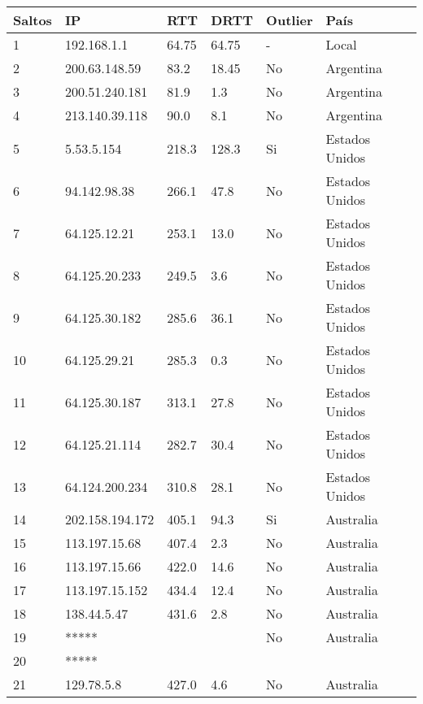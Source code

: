 \begin{center}
    \begin{tabular}{| l | l | l | l | l | l | }
    \hline
    Saltos & IP             & RTT    & DRTT   & Outlier & País       \\ \hline
    1    &    192.168.1.1     & 64.75 &  64.75 & -  & Local          \\ \hline 
    2    &    200.63.148.59   & 83.2  &  18.45 & No & Argentina      \\ \hline
    3    &    200.51.240.181  & 81.9  &  1.3   & No & Argentina      \\ \hline
    4    &    213.140.39.118  & 90.0  &  8.1   & No & Argentina      \\ \hline
    5    &    5.53.5.154      & 218.3 &  128.3 & Si & Estados Unidos \\ \hline
    6    &    94.142.98.38    & 266.1 &  47.8  & No & Estados Unidos \\ \hline
    7    &    64.125.12.21    & 253.1 &  13.0  & No & Estados Unidos \\ \hline
    8    &    64.125.20.233   & 249.5 &  3.6   & No & Estados Unidos \\ \hline
    9    &    64.125.30.182   & 285.6 &  36.1  & No & Estados Unidos \\ \hline
    10   &    64.125.29.21    & 285.3 &  0.3   & No & Estados Unidos \\ \hline
    11   &    64.125.30.187   & 313.1 &  27.8  & No & Estados Unidos \\ \hline
    12   &    64.125.21.114   & 282.7 &  30.4  & No & Estados Unidos \\ \hline
    13   &    64.124.200.234  & 310.8 &  28.1  & No & Estados Unidos \\ \hline
    14   &    202.158.194.172 & 405.1 &  94.3  & Si & Australia      \\ \hline
    15   &    113.197.15.68   & 407.4 &  2.3   & No & Australia      \\ \hline
    16   &    113.197.15.66   & 422.0 &  14.6  & No & Australia      \\ \hline
    17   &    113.197.15.152  & 434.4 &  12.4  & No & Australia      \\ \hline
    18   &    138.44.5.47     & 431.6 &  2.8   & No & Australia      \\ \hline
    19   &    *****           &       &        & No & Australia      \\ \hline
    20   &    *****           &       &        &    &                \\ \hline
    21   &    129.78.5.8      & 427.0 & 4.6    & No & Australia      \\ \hline
    \end{tabular}
\end{center}
